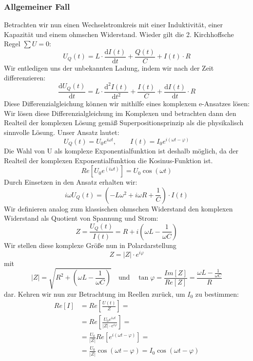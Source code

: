 \subsubsection{Allgemeiner Fall}
Betrachten wir nun einen Wechselstromkreis mit einer Induktivität, einer Kapazität und einem ohmschen Widerstand. Wieder gilt die 2. Kirchhoffsche Regel $\sum U = 0$:
\begin{equation}
U_Q(t) = L \cdot \frac{\mathrm{d}I(t)}{\mathrm{d}t} + \frac{Q(t)}{C} + I(t) \cdot R
\end{equation}
Wir entledigen uns der unbekannten Ladung, indem wir nach der Zeit differenzieren:
\begin{equation}
\frac{\mathrm dU_Q(t)}{\mathrm dt} = L \cdot \frac{\mathrm{d^2}I(t)}{\mathrm{d}t^2} + \frac{I(t)}{C} + \frac{\mathrm dI(t)}{\mathrm dt} \cdot R
\end{equation}
Diese Differenzialgleichung können wir mithilfe eines komplexem e-Ansatzes lösen:
Wir lösen diese Differenzialgleichung im Komplexen und betrachten dann den Realteil der komplexen Lösung gemäß Superpositionsprinzip als die physikalisch sinnvolle Lösung. Unser Ansatz lautet:
\begin{equation}
U_Q(t) = U_0 e^{i\omega t},	\qquad	I(t) = I_0 e^{i(\omega t-\varphi)}
\end{equation}
Die Wahl von U als komplexe Exponentialfunktion ist deshalb möglich, da der Realteil der komplexen Exponentialfunktion die Kosinus-Funktion ist.
\begin{equation}
Re\left[ U_0 e^{(i\omega t)}\right]  = U_0 \cos{(\omega t)}
\end{equation}
Durch Einsetzen in den Ansatz erhalten wir:
\begin{equation}
i\omega U_Q(t) = (- L \omega^2 + i \omega R  + \frac{1}{C}) \cdot I(t)
\end{equation}
Wir definieren analog zum klassischen ohmschen Widerstand den komplexen Widerstand als Quotient von Spannung und Strom:
\begin{equation}
Z = \frac{U_Q(t)}{I(t)} = R + i ( \omega L - \frac{1}{\omega C})
\end{equation}
Wir stellen diese komplexe Größe nun in Polardarstellung
\begin{equation}
Z = |Z| \cdot e^{i\varphi}
\end{equation}
mit
\begin{equation}\label{eq:Zpolar}
|Z| = \sqrt{ R^2 + \left( \omega L - \frac{1}{\omega C} \right) }\quad {\mathrm{und}} \quad \tan\varphi = \frac{Im[Z]}{Re[Z]} = \frac{\omega L - \frac{1}{\omega C}}{R}
\end{equation}
dar. Kehren wir nun zur Betrachtung im Reellen zurück, um $I_0$ zu bestimmen:
\begin{align}
\nonumber
Re\left[ I \right]
&= Re\left[ \frac{U(t)}{Z} \right] =\\\nonumber
&= Re\left[ \frac{U_0 e^{i\omega t}}{|Z|\cdot e^{i\varphi}} \right] =\\\nonumber
&= \frac{U_0}{|Z|} Re\left[ e^{i(\omega t - \varphi)} \right] =\\
&= \frac{U_0}{|Z|} \cos(\omega t - \varphi) = I_0 \cos(\omega t - \varphi)
\end{align}

